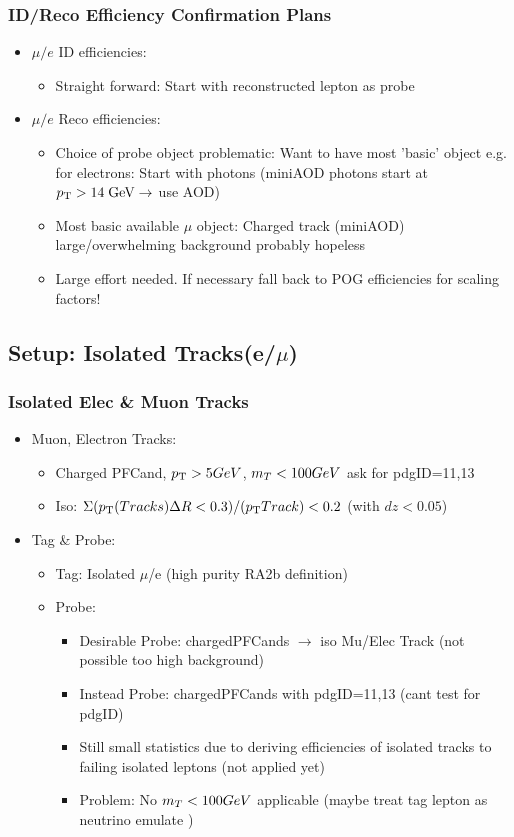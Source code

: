 \documentclass{beamer}
\begin{document}
\begin{frame}
 \frametitle{ID/Reco Efficiency Confirmation Plans}
 \begin{itemize}
  \item $\mu/e$ ID efficiencies:
  \begin{itemize}
   \item Straight forward: Start with reconstructed lepton as probe
  \end{itemize}
  \item $\mu/e$ Reco efficiencies:
  \begin{itemize}
   \item Choice of probe object problematic: Want to have most 'basic' object e.g. for electrons: Start with photons (miniAOD photons start at $p_{\text{T}}>14 \;\text{Ge}\kern-0.06667em\text{V}\rightarrow$ use AOD)
   \item Most basic available $\mu$ object: Charged track (miniAOD) large/overwhelming background probably hopeless
   \item Large effort needed. If necessary fall back to POG efficiencies for scaling factors!
  \end{itemize}
 

 \end{itemize}

\end{frame}
\subsection{Setup: Isolated Tracks(e/$\mu$)}
\begin{frame}
 \frametitle{Isolated Elec \& Muon Tracks}
 \begin{itemize}
 \item Muon, Electron Tracks:
 \begin{itemize}
  \item Charged PFCand, $p_{\text{T}}>5 GeV$, $m_{T}<100 GeV$ ask for pdgID=11,13
  \item Iso: $\Sigma ( p_{\text{T}}\text(Tracks)\Delta R<0.3 )/(p_{\text{T}} Track) < 0.2$ (with $dz<0.05$)
 \end{itemize}
 \item Tag \& Probe:
 \begin{itemize}
  \item Tag: Isolated $\mu$/e (high purity RA2b definition)
  \item Probe:
 \begin{itemize}
  \item Desirable Probe: chargedPFCands $\rightarrow$ iso Mu/Elec Track (not possible too high background)
  \item Instead Probe: chargedPFCands with pdgID=11,13 (cant test for pdgID)
  \item Still small statistics due to deriving efficiencies of isolated tracks to failing isolated leptons (not applied yet)
  \item Problem: No $m_{T}<100 GeV$ applicable (maybe treat tag lepton as neutrino emulate \wtolnu)
 \end{itemize}
  \end{itemize}
 \end{itemize}
\end{frame}
\end{document}
